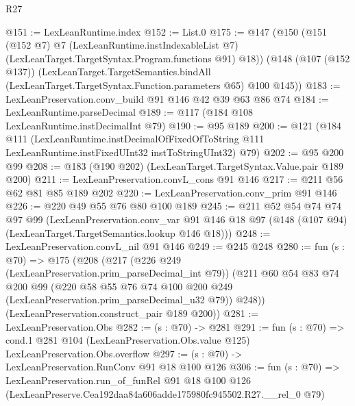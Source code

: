 \begin{lexlean}{R27}
\begin{coremodule}
@151 := LexLeanRuntime.index
@152 := List.{0}
@175 := @147
    (@150
      (@151
        (@152 @7)
        @7
        (LexLeanRuntime.instIndexableList @7)
        (LexLeanTarget.TargetSyntax.Program.functions @91)
        @18))
    (@148
      (@107 (@152 @137))
      (LexLeanTarget.TargetSemantics.bindAll
        (LexLeanTarget.TargetSyntax.Function.parameters @65)
        @100
        @145))
@183 := LexLeanPreservation.conv_build @91 @146 @42 @39 @63 @86 @74
@184 := LexLeanRuntime.parseDecimal
@189 := @117 (@184 @108 LexLeanRuntime.instDecimalInt @79)
@190 := @95 @189
@200 := @121
    (@184
      @111
      (LexLeanRuntime.instDecimalOfFixedOfToString
        @111
        LexLeanRuntime.instFixedUInt32
        instToStringUInt32)
      @79)
@202 := @95 @200 @99
@208 := @183 (@190 @202) (LexLeanTarget.TargetSyntax.Value.pair @189 @200)
@211 := LexLeanPreservation.convL_cons @91 @146
@217 := @211 @56 @62 @81 @85 @189 @202
@220 := LexLeanPreservation.conv_prim @91 @146
@226 := @220 @49 @55 @76 @80 @100 @189
@245 := @211
    @52
    @54
    @74
    @74
    @97
    @99
    (LexLeanPreservation.conv_var
      @91
      @146
      @18
      @97
      (@148 (@107 @94) (LexLeanTarget.TargetSemantics.lookup @146 @18)))
@248 := LexLeanPreservation.convL_nil @91 @146
@249 := @245 @248
@280 := fun (s : @70) =>
  @175
    (@208
      (@217
        (@226 @249 (LexLeanPreservation.prim_parseDecimal_int @79))
        (@211
          @60
          @54
          @83
          @74
          @200
          @99
          (@220 @58 @55 @76 @74 @100 @200 @249 (LexLeanPreservation.prim_parseDecimal_u32 @79))
          @248))
      (LexLeanPreservation.construct_pair @189 @200))
@281 := LexLeanPreservation.Obs
@282 := (s : @70) -> @281
@291 := fun (s : @70) =>
  cond.{1} @281 @104 (LexLeanPreservation.Obs.value @125) LexLeanPreservation.Obs.overflow
@297 := (s : @70) -> LexLeanPreservation.RunConv @91 @18 @100 @126
@306 := fun (s : @70) =>
  LexLeanPreservation.run_of_funRel
    @91
    @18
    @100
    @126
    (LexLeanPreserve.Cea192daa84a606adde175980fc945502.R27.__rel_0 @79)
\end{coremodule}
\end{lexlean}
